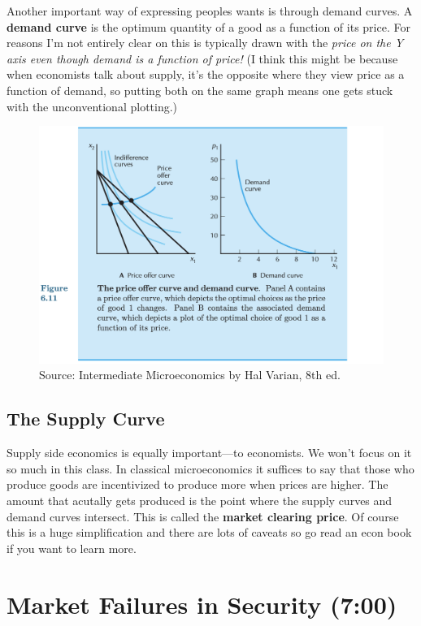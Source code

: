 \documentclass[11pt]{article}
\begin{document}
Another important way of expressing peoples wants is through demand curves. 
A {\bf demand curve} is the optimum quantity of a good as a function of its price. 
For reasons I'm not entirely clear on this is typically drawn with the {\it price on the Y axis even though demand is a function of price!}
(I think this might be because when economists talk about supply, it's the opposite where they view price as a function of demand, so putting both on the same graph means one gets stuck with the unconventional plotting.)



\begin{figure}[h]
    \centering
    \includegraphics*[width=4.5in]{demandcurve.png}
    \caption{Source: Intermediate Microeconomics by Hal Varian, 8th ed.}
    \label{fig:demand}
\end{figure}

\subsection{The Supply Curve}

Supply side economics is equally important---to economists. We won't focus on it so much in this class. In classical microeconomics it suffices to say that those who produce goods are incentivized to produce more when prices are higher. The amount that acutally gets produced is the point where the supply curves and demand curves intersect. This is called the {\bf market clearing price}. Of course this is a huge simplification and there are lots of caveats so go read an econ book if you want to learn more. 

\section{Market Failures in Security (7:00)}
\end{document}
